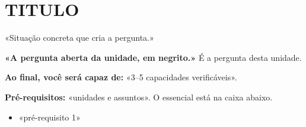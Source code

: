 \clearpage
\section{{{TITULO}}}

\Prefacio
\begin{prefacio}

«Situação concreta que cria a pergunta.»

\textbf{«A pergunta aberta da unidade, em negrito.»} É a pergunta desta unidade.

\textbf{Ao final, você será capaz de:} «3–5 capacidades verificáveis».

\textbf{Pré-requisitos:} «unidades e assuntos». O essencial está na caixa abaixo.
\end{prefacio}

\begin{minimo}
\begin{itemize}[leftmargin=1.4em,itemsep=1pt]
  \item «pré-requisito 1»
\end{itemize}
\end{minimo}

\DeOndeVem

